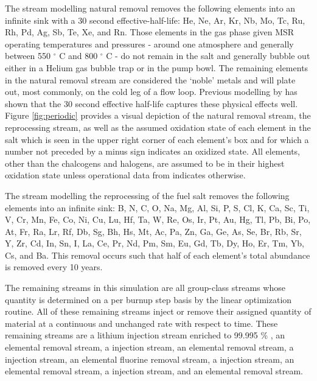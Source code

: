 The stream modelling natural removal removes the following elements into an 
infinite sink with a 30 second effective-half-life: He, Ne, Ar, Kr, Nb,
Mo, Tc, Ru, Rh, Pd, Ag, Sb, Te, Xe, and Rn. Those elements in the gas phase
given MSR operating temperatures and pressures - around one atmosphere and
generally between 550 $^{\circ}$ C and 800 $^{\circ}$ C - do not remain in
the salt and generally bubble out either in a Helium gas bubble trap or in the
pump bowl. The remaining elements in the natural removal stream are considered
the `noble' metals and will plate out, most commonly, on the cold leg of a flow
loop. Previous modelling by \cite{Aufiero} has shown that the 30 second
effective half-life captures these physical effects well. Figure 
\ref{fig:periodic} provides a visual depiction of the natural removal stream,
the reprocessing stream, as well as the assumed oxidation state of each element
in the salt which is seen in the upper right corner of each element's box and
for which a number not preceded by a minus sign indicates an oxidized state.
All elements, other than the chalcogens and halogens, are assumed to be in 
their highest oxidation state unless operational data from \cite{ORNL} 
indicates otherwise.

The stream modelling the reprocessing of the fuel salt removes the following
elements into an infinite sink: B, N, C, O, Na, Mg, Al, Si, P, S, Cl, K, Ca, Sc,
Ti, V, Cr, Mn, Fe, Co, Ni, Cu, Lu, Hf, Ta, W, Re, Os, Ir, Pt, Au, Hg, Tl, Pb,
Bi, Po, At, Fr, Ra, Lr, Rf, Db, Sg, Bh, Hs, Mt, Ac, Pa, Zn, Ga, Ge, As, Se, Br,
Rb, Sr, Y, Zr, Cd, In, Sn, I, La, Ce, Pr, Nd, Pm, Sm, Eu, Gd, Tb, Dy, Ho, Er,
Tm, Yb, Cs, and Ba. This removal occurs such that half of each element's total
abundance is removed every 10 years. 

The remaining streams in this simulation are all group-class streams whose
quantity is determined on a per burnup step basis by the linear optimization
routine. All of these remaining streams inject or remove their assigned quantity
of material at a continuous and unchanged rate with respect to time. These
remaining streams are a lithium injection stream enriched to 99.995 \% 
, an elemental  removal stream, a  injection
stream, an elemental  removal stream, a  injection stream, 
an elemental fluorine removal stream, a  injection stream, an
elemental  removal stream, a  injection stream, and an
elemental  removal stream.

